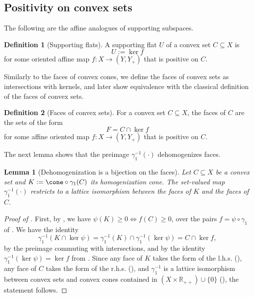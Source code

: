 \documentclass{article}
\theoremstyle{plain}
\newtheorem{lemma}[lemma]{Lemma}
\theoremstyle{definition}
\newtheorem{definition}[definition]{Definition}
\theoremstyle{remark}
\begin{document}
\subsection{Positivity on convex sets}
\label{loc:body.positivity_minimization_and_faces.positivity_on_convex_sets}
The following are the affine analogues of supporting subspaces.
\begin{definition}[Supporting flats]
\label{loc:supporting_flats.statement}
A supporting flat $U$ of a convex set $C \subseteq X$ is
\begin{equation*}
U := \ker f
\end{equation*}
for some oriented affine map $f:X \to (Y, Y_+)$ that is positive on $C$.
\end{definition}
Similarly to the faces of convex cones, we define the faces of convex sets as intersections with kernels, and later show equivalence with the classical definition of the faces of convex sets.
\begin{definition}[Faces of convex sets]
\label{loc:faces_of_convex_sets.statement}
For a convex set $C \subseteq X$, the faces of $C$ are the sets of the form
\begin{equation*}
F = C \cap \ker f
\end{equation*}
for some affine oriented map $f:X \to (Y, Y_+)$ that is positive on $C$.
\end{definition}
The next lemma shows that the preimage $\gamma_1^{-1}(\cdot)$ dehomogenizes faces. 
\begin{lemma}[Dehomogenization is a bijection on the faces]
\label{loc:dehomogenization_is_a_bijection_on_the_faces.statement}
Let $C \subseteq X$ be a convex set and $K := \cone \circ \gamma_1(C)$ its homogenization cone.
The set-valued map $\gamma_1^{-1}(\cdot)$ restricts to a lattice
isomorphism between the faces of $K$ and the faces of $C$.
\end{lemma}
\begin{proof}[\hypertarget{loc:dehomogenization_is_a_bijection_on_the_faces.proof}{}Proof of ]

First, by ,
we have $\psi(K) \geq 0 \iff f(C) \geq 0$, over the pairs $f = \psi \circ \gamma_1$ of . We have the identity
\begin{equation*}
\gamma_1^{-1}(K \cap \ker \psi) = \gamma_1^{-1}(K) \cap \gamma_1^{-1}(\ker \psi) = C \cap \ker f,
\end{equation*}
by the preimage commuting with intersections, and by the identity $\gamma_1^{-1}(\ker \psi)= \ker f$ from .
Since any face of $K$ takes the form of the l.h.s. (), any face of $C$ takes the form of the r.h.s. (), and $\gamma_1^{-1}$ is a lattice isomorphism between convex sets and convex
cones contained in $(X \times \mathbb{R}_{++})\cup\{0\}$ (), the statement follows.
\end{proof}
\end{document}
